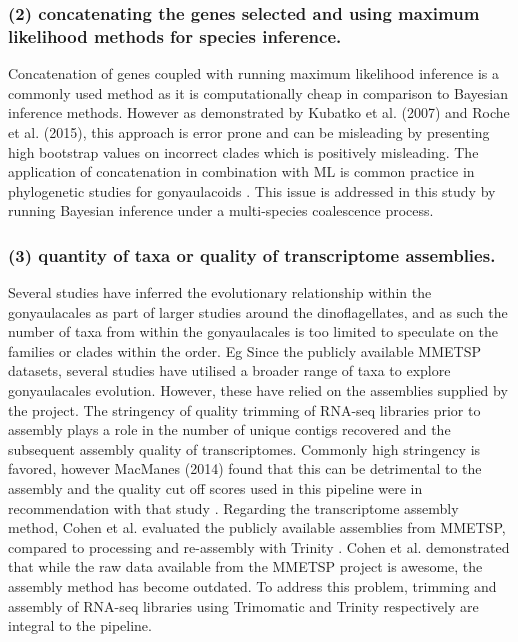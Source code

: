 \documentclass[12pt]{article}
\begin{document}
\subsubsection*{(2) concatenating the genes selected and using maximum likelihood methods for species inference.}
Concatenation of genes coupled with running maximum likelihood inference is a commonly used method as it is computationally cheap in comparison to Bayesian inference methods. 
However as demonstrated by Kubatko et al. (2007) and Roche et al. (2015), this approach is error prone and can be misleading by presenting high bootstrap values on incorrect clades which is positively misleading.
The application of concatenation in combination with ML is common practice in phylogenetic studies for gonyaulacoids  \cite{shalchian2006combined,zhang2007three,saldarriaga2004molecular,murray2005improving,hoppenrath2010dinoflagellate}.
This issue is addressed in this study by running Bayesian inference under a multi-species coalescence process.
\subsubsection*{(3) quantity of taxa or quality of transcriptome assemblies.}
Several studies have inferred the evolutionary relationship within the gonyaulacales as part of larger studies around the dinoflagellates, and as such the number of taxa from within the gonyaulacales is too limited to speculate on the families or clades within the order. Eg \cite{shalchian2006combined,zhang2007three,saldarriaga2004molecular,hoppenrath2010dinoflagellate,murray2005improving}
Since the publicly available MMETSP datasets, several studies have utilised a broader range of taxa to explore gonyaulacales evolution. 
However, these have relied on the assemblies supplied by the project. 
The stringency of quality trimming of RNA-seq libraries prior to assembly plays a role in the number of unique contigs recovered and the subsequent assembly quality of transcriptomes. 
Commonly high stringency is favored, however MacManes (2014) found that this can be detrimental to the assembly and the quality cut off scores used in this pipeline were in recommendation with that study \cite{macmanes2014optimal}.
Regarding the transcriptome assembly method, Cohen et al. evaluated the publicly available assemblies from MMETSP, compared to processing and re-assembly with Trinity \cite{cohen-reass}. 
Cohen et al. demonstrated that while the raw data available from the MMETSP project is awesome, the assembly method has become outdated. 
To address this problem, trimming and assembly of RNA-seq libraries using Trimomatic and Trinity respectively are integral to the pipeline.
\end{document}
